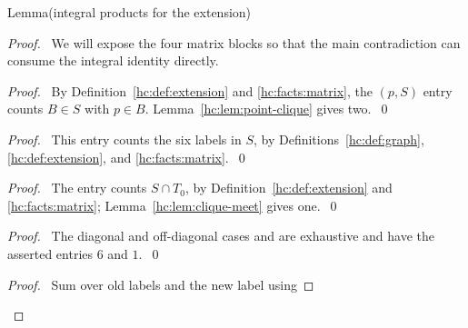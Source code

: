 \begin{mergedproofsection}
\begin{namedresult}{Lemma}{(integral products for the extension)}\label{hc:lem:extension-products}
 \leavevmode\par
\end{namedresult}
\begin{proof}
 \pfsketch\ We will expose the four matrix blocks so that the main
 contradiction can consume the integral identity directly.
 \begin{proof}\pf\ By Definition~\ref{hc:def:extension} and
  \ref{hc:facts:matrix}, the $(p,S)$ entry counts $B\in S$ with
  $p\in B$. Lemma~\ref{hc:lem:point-clique} gives two.~\qed\end{proof}
 \begin{proof}\pf\ This entry counts the six labels in $S$, by
  Definitions~\ref{hc:def:graph}, \ref{hc:def:extension}, and
  \ref{hc:facts:matrix}.~\qed\end{proof}
 \begin{proof}\pf\ The entry counts $S\cap T_0$, by
  Definition~\ref{hc:def:extension} and \ref{hc:facts:matrix};
  Lemma~\ref{hc:lem:clique-meet} gives one.~\qed\end{proof}
 \begin{proof}\pf\ The diagonal and off-diagonal cases
   and  are
  exhaustive and have the asserted entries $6$ and $1$.~\qed\end{proof}
 \begin{proof}\pf\ Sum over old labels and the new label using

\end{proof}
\end{proof}
\end{mergedproofsection}
